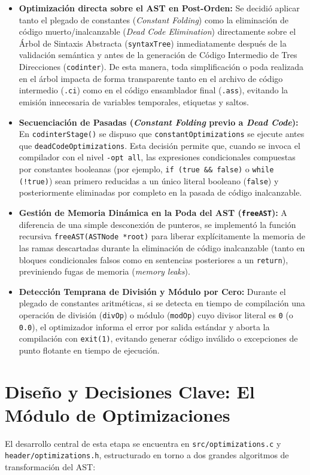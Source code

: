 \documentclass[12pt, a4paper]{article}
\begin{document}
\begin{itemize}
    \item \textbf{Optimización directa sobre el AST en Post-Orden:} Se decidió aplicar tanto el plegado de constantes (\textit{Constant Folding}) como la eliminación de código muerto/inalcanzable (\textit{Dead Code Elimination}) directamente sobre el Árbol de Sintaxis Abstracta (\texttt{syntaxTree}) inmediatamente después de la validación semántica y antes de la generación de Código Intermedio de Tres Direcciones (\texttt{codinter}). De esta manera, toda simplificación o poda realizada en el árbol impacta de forma transparente tanto en el archivo de código intermedio (\texttt{.ci}) como en el código ensamblador final (\texttt{.ass}), evitando la emisión innecesaria de variables temporales, etiquetas y saltos.
    \item \textbf{Secuenciación de Pasadas (\textit{Constant Folding} previo a \textit{Dead Code}):} En \texttt{codinterStage()} se dispuso que \texttt{constantOptimizations} se ejecute antes que \texttt{deadCodeOptimizations}. Esta decisión permite que, cuando se invoca el compilador con el nivel \texttt{-opt all}, las expresiones condicionales compuestas por constantes booleanas (por ejemplo, \texttt{if (true \&\& false)} o \texttt{while (!true)}) sean primero reducidas a un único literal booleano (\texttt{false}) y posteriormente eliminadas por completo en la pasada de código inalcanzable.
    \item \textbf{Gestión de Memoria Dinámica en la Poda del AST (\texttt{freeAST}):} A diferencia de una simple desconexión de punteros, se implementó la función recursiva \texttt{freeAST(ASTNode *root)} para liberar explícitamente la memoria de las ramas descartadas durante la eliminación de código inalcanzable (tanto en bloques condicionales falsos como en sentencias posteriores a un \texttt{return}), previniendo fugas de memoria (\textit{memory leaks}).
    \item \textbf{Detección Temprana de División y Módulo por Cero:} Durante el plegado de constantes aritméticas, si se detecta en tiempo de compilación una operación de división (\texttt{divOp}) o módulo (\texttt{modOp}) cuyo divisor literal es \texttt{0} (o \texttt{0.0}), el optimizador informa el error por salida estándar y aborta la compilación con \texttt{exit(1)}, evitando generar código inválido o excepciones de punto flotante en tiempo de ejecución.
\end{itemize}

\section{Diseño y Decisiones Clave: El Módulo de Optimizaciones}
El desarrollo central de esta etapa se encuentra en \texttt{src/optimizations.c} y \texttt{header/optimizations.h}, estructurado en torno a dos grandes algoritmos de transformación del AST:
\end{document}
